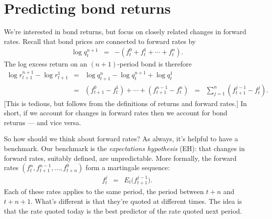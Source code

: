 \documentclass[11pt]{article}
\begin{document}
\section{Predicting bond returns}

We're interested in bond returns, but focus on
closely related changes in forward rates.
Recall that bond prices are connected to forward rates by
\begin{eqnarray*}
    \log q^{n+1}_t &=& -(f^0_t + f^1_t + \cdots + f^{n}_t) .
\end{eqnarray*}
The log excess return on an $(n+1)$-period bond is therefore
\begin{eqnarray*}
    \log r^{n+1}_{t+1} - \log r^1_{t+1}
         &=& \log q^n_{t+1} - \log q^{n+1}_t + \log q^1_t \\
         &=& (f^0_{t+1} - f^1_t) + \cdots + (f^{n-1}_{t+1} - f^n_t)
         \;\;=\;\; \sum_{j=1}^n (f^{j-1}_{t+1} - f^j_t) .
\end{eqnarray*}
[This is tedious, but follows from the definitions of returns and forward rates.]
In short, if we account for changes in forward rates then we account for bond returns ---
and vice versa.



So how should we think about forward rates?
As always, it's helpful to have a benchmark.
Our benchmark is the {\it expectations hypothesis\/} (EH):
that changes in forward rates, suitably defined, are unpredictable.
More formally, the forward rates
$(f^n_t, f^{n-1}_{t+1}, ... , f^0_{t+n})$
form a martingale sequence:
\begin{eqnarray*}
    f^j_t &=& E_t \big( f^{j-1}_{t+1} \big) .
\end{eqnarray*}
Each of these rates applies to the same period,
the period between $t+n$ and $t+n+1$.
What's different is that they're quoted at different times.
The idea is that the rate quoted today is the best predictor of the rate
quoted next period.
\end{document}
